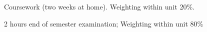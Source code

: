 


    Coursework (two weeks at home).  Weighting within unit 20\%.


\bigskip


  2 hours end of semester examination;  Weighting within unit 80\%


 \bye
